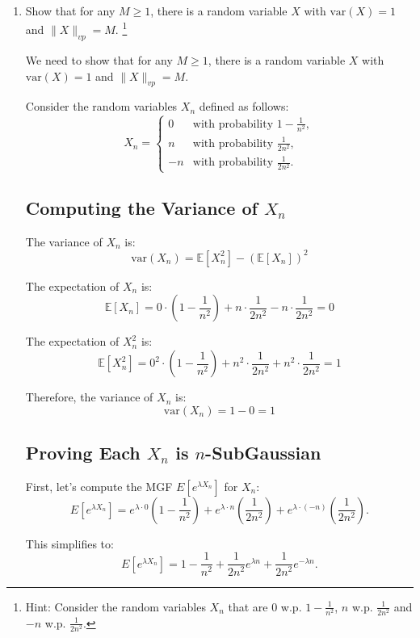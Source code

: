 \documentclass[a4 paper]{article}
\theoremstyle{boldStyle}
\theoremstyle{boldBlueStyle}
\theoremstyle{boldPurpleStyle}
\theoremstyle{boldRedStyle}
\begin{document}
\begin{enumerate}
\newpage
\item \textcolor{blueColor}{Show that for any \(M \geq 1\), there is a random variable \(X\) with \(\mathrm{var}(X) = 1\) and \(\|X\|_{vp} = M\).}
\footnote{Hint: Consider the random variables \(X_n\) that are 0 w.p. \(1-\frac{1}{n^2}\), \(n\) w.p. \(\frac{1}{2n^2}\) and \(-n\) w.p. \(\frac{1}{2n^2}\).}



We need to show that for any \(M \geq 1\), there is a random variable \(X\) with \(\mathrm{var}(X) = 1\) and \(\|X\|_{vp} = M\).

Consider the random variables \(X_n\) defined as follows:
\[
X_n = \begin{cases} 
0 & \text{with probability } 1 - \frac{1}{n^2}, \\
n & \text{with probability } \frac{1}{2n^2}, \\
-n & \text{with probability } \frac{1}{2n^2}.
\end{cases}
\]

\subsection*{Computing the Variance of $X_n$}

The variance of \(X_n\) is:
\[
\mathrm{var}(X_n) = \mathbb{E}[X_n^2] - (\mathbb{E}[X_n])^2
\]

The expectation of \(X_n\) is:
\[
\mathbb{E}[X_n] = 0 \cdot \left(1 - \frac{1}{n^2}\right) + n \cdot \frac{1}{2n^2} - n \cdot \frac{1}{2n^2} = 0
\]

The expectation of \(X_n^2\) is:
\[
\mathbb{E}[X_n^2] = 0^2 \cdot \left(1 - \frac{1}{n^2}\right) + n^2 \cdot \frac{1}{2n^2} + n^2 \cdot \frac{1}{2n^2} = 1
\]

Therefore, the variance of \(X_n\) is:
\[
\mathrm{var}(X_n) = 1 - 0 = 1
\]


\subsection*{Proving Each $X_n$ is $n$-SubGaussian}

First, let's compute the MGF $E[e^{\lambda X_n}]$ for $X_n$:
\[
E[e^{\lambda X_n}] = e^{\lambda \cdot 0} \left(1 - \frac{1}{n^2}\right) + e^{\lambda \cdot n} \left(\frac{1}{2n^2}\right) + e^{\lambda \cdot (-n)} \left(\frac{1}{2n^2}\right).
\]

This simplifies to:
\[
E[e^{\lambda X_n}] = 1 - \frac{1}{n^2} + \frac{1}{2n^2} e^{\lambda n} + \frac{1}{2n^2} e^{-\lambda n}.
\]


\end{enumerate}
\end{document}

